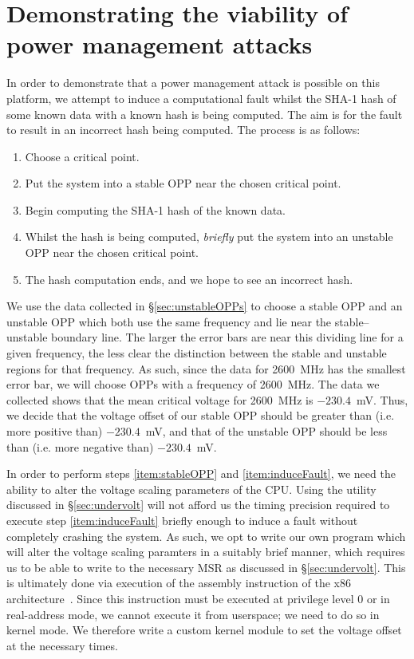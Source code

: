 \section{Demonstrating the viability of power management attacks}
\label{sec:observing-fault}

In order to demonstrate that a power management attack is possible on this
platform, we attempt to induce a computational fault whilst the SHA-1 hash of
some known data with a known hash is being computed. The aim is for the fault
to result in an incorrect hash being computed. The process is as follows:

\begin{enumerate}
    \item Choose a critical point.
    \item \label{item:stableOPP} Put the system into a stable OPP near the
        chosen critical point.
    \item \label{item:beginSHA} Begin computing the SHA-1 hash of the known data.
    \item \label{item:induceFault} Whilst the hash is being computed,
        \emph{briefly} put the system into an unstable OPP near the chosen
        critical point.
    \item The hash computation ends, and we hope to see an incorrect hash.
\end{enumerate}

We use the data collected in §\ref{sec:unstableOPPs} to choose a stable OPP and
an unstable OPP which both use the same frequency and lie near the
stable–unstable boundary line. The larger the error bars are near this dividing
line for a given frequency, the less clear the distinction between the stable and
unstable regions for that frequency. As such, since the data for 2600~MHz has
the smallest error bar, we will choose OPPs with a frequency of 2600~MHz.
The data we collected shows that the mean critical voltage for 2600~MHz
is $-230.4$~mV. Thus, we decide that the voltage offset of our stable OPP
should be greater than (i.e. more positive than) $-230.4$~mV, and that of the
unstable OPP should be less than (i.e. more negative than) $-230.4$~mV.

In order to perform steps \ref{item:stableOPP} and \ref{item:induceFault}, we
need the ability to alter the voltage scaling parameters of the CPU. Using the
 utility discussed in §\ref{sec:undervolt} will not afford us the
timing precision required to execute step \ref{item:induceFault} briefly enough
to induce a fault without completely crashing the system. As such, we opt to
write our own program which will alter the voltage scaling paramters in a
suitably brief manner, which requires us to be able to write to the necessary
MSR as discussed in §\ref{sec:undervolt}. This is ultimately done via execution
of the  assembly instruction of the x86
architecture~\cite[Vol. 2, §4.4]{intelDevManual}. Since this instruction
must be executed at privilege level 0 or in real-address mode, we cannot
execute it from userspace; we need to do so in kernel mode. We therefore write
a custom kernel module to set the voltage offset at the necessary times.


